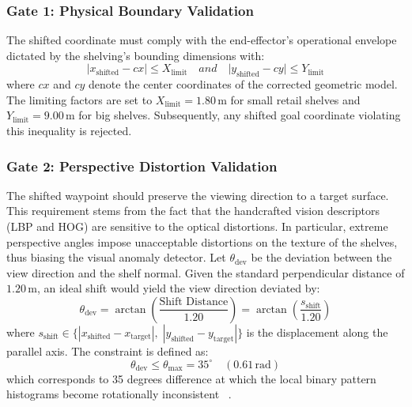 \subsubsection*{Gate 1: Physical Boundary Validation}

The shifted coordinate must comply with the end-effector's operational envelope dictated by the shelving's bounding dimensions with:
\begin{equation} \lvert x_{\text{shifted}} - cx \rvert \le X_{\text{limit}} \quad and \quad \lvert y_{\text{shifted}} - cy \rvert \le Y_{\text{limit}} \label{eq:boundary_validation_limits} \end{equation}
where $cx$ and $cy$ denote the center coordinates of the corrected geometric model. The limiting factors are set to $X_{\text{limit}} = 1.80\,\text{m}$ for small retail shelves and $Y_{\text{limit}} = 9.00\,\text{m}$ for big shelves. Subsequently, any shifted goal coordinate violating this inequality is rejected.

\subsubsection*{Gate 2: Perspective Distortion Validation}

The shifted waypoint should preserve the viewing direction to a target surface. This requirement stems from the fact that the handcrafted vision descriptors (LBP and HOG) are sensitive to the optical distortions. In particular, extreme perspective angles impose unacceptable distortions on the texture of the shelves, thus biasing the visual anomaly detector. Let $\theta_{\text{dev}}$ be the deviation between the view direction and the shelf normal. Given the standard perpendicular distance of $1.20\,\text{m}$, an ideal shift would yield the view direction deviated by:
\begin{equation} \theta_{\text{dev}} = \arctan\left( \frac{\text{Shift Distance}}{1.20} \right) = \arctan\left( \frac{s_{\text{shift}}}{1.20} \right) \label{eq:perspective_deviation_formula} \end{equation}
where $s_{\text{shift}} \in \{|x_{\text{shifted}} - x_{\text{target}}|, \; |y_{\text{shifted}} - y_{\text{target}}|\}$ is the displacement along the parallel axis. The constraint is defined as:
\begin{equation} \theta_{\text{dev}} \le \theta_{\text{max}} = 35^\circ \quad (0.61\,\text{rad}) \label{eq:perspective_validation_gate} \end{equation}
which corresponds to 35 degrees difference at which the local binary pattern histograms become rotationally inconsistent ~\cite{zitouni2022local}.

